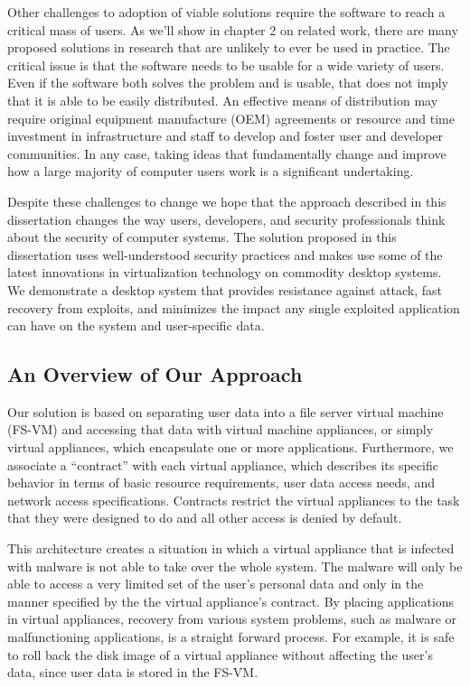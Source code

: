 Other challenges to adoption of viable solutions require the software to reach a critical mass of users.  As we'll show in chapter 2 on related work, there are many proposed solutions in research that are unlikely to ever be used in practice. The critical issue is that the software needs to be usable for a wide variety of users. Even if the software both solves the problem and is usable, that does not imply that it is able to be easily distributed. An effective means of distribution may require original equipment manufacture (OEM) agreements or resource and time investment in infrastructure and staff to develop and foster user and developer communities. In any case, taking ideas that fundamentally change and improve how a large majority of computer users work is a significant undertaking.

Despite these challenges to change we hope that the approach described in this dissertation changes the way users, developers, and security professionals think about the security of computer systems. The solution proposed in this dissertation uses well-understood security practices and makes use some of the latest innovations in virtualization technology on commodity desktop systems. We demonstrate a desktop system that provides resistance against attack, fast recovery from exploits, and minimizes the impact any single exploited application can have on the system and user-specific data.

\subsection{An Overview of Our Approach}

Our solution is based on separating user data into a file server virtual machine (FS-VM) and accessing that data with virtual machine appliances, or simply virtual appliances, which encapsulate one or more applications. Furthermore, we associate a ``contract'' with each virtual appliance, which describes its specific behavior in terms of basic resource requirements, user data access needs, and network access specifications. Contracts restrict the virtual appliances to the task that they were designed to do and all other access is denied by default.

This architecture creates a situation in which a virtual appliance that is infected with malware is not able to take over the whole system. The malware will only be able to access a very limited set of the user's personal data and only in the manner specified by the the virtual appliance's contract. By placing applications in virtual appliances, recovery from various system problems, such as malware or malfunctioning applications, is a straight forward process. For example, it is safe to roll back the disk image of a virtual appliance without affecting the user's data, since user data is stored in the FS-VM. 

